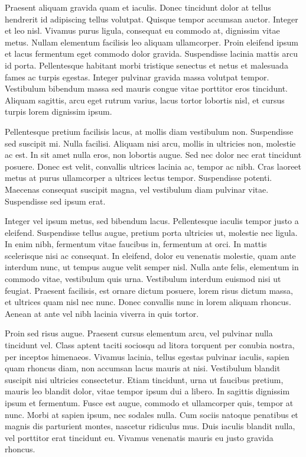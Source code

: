 Praesent aliquam gravida quam et iaculis. Donec tincidunt dolor at tellus hendrerit id adipiscing tellus volutpat. Quisque tempor accumsan auctor. Integer et leo nisl. Vivamus purus ligula, consequat eu commodo at, dignissim vitae metus. Nullam elementum facilisis leo aliquam ullamcorper. Proin eleifend ipsum et lacus fermentum eget commodo dolor gravida. Suspendisse lacinia mattis arcu id porta. Pellentesque habitant morbi tristique senectus et netus et malesuada fames ac turpis egestas. Integer pulvinar gravida massa volutpat tempor. Vestibulum bibendum massa sed mauris congue vitae porttitor eros tincidunt. Aliquam sagittis, arcu eget rutrum varius, lacus tortor lobortis nisl, et cursus turpis lorem dignissim ipsum.

Pellentesque pretium facilisis lacus, at mollis diam vestibulum non. Suspendisse sed suscipit mi. Nulla facilisi. Aliquam nisi arcu, mollis in ultricies non, molestie ac est. In sit amet nulla eros, non lobortis augue. Sed nec dolor nec erat tincidunt posuere. Donec est velit, convallis ultrices lacinia ac, tempor ac nibh. Cras laoreet metus at purus ullamcorper a ultrices lectus tempor. Suspendisse potenti. Maecenas consequat suscipit magna, vel vestibulum diam pulvinar vitae. Suspendisse sed ipsum erat.

Integer vel ipsum metus, sed bibendum lacus. Pellentesque iaculis tempor justo a eleifend. Suspendisse tellus augue, pretium porta ultricies ut, molestie nec ligula. In enim nibh, fermentum vitae faucibus in, fermentum at orci. In mattis scelerisque nisi ac consequat. In eleifend, dolor eu venenatis molestie, quam ante interdum nunc, ut tempus augue velit semper nisl. Nulla ante felis, elementum in commodo vitae, vestibulum quis urna. Vestibulum interdum euismod nisi ut feugiat. Praesent facilisis, est ornare dictum posuere, lorem risus dictum massa, et ultrices quam nisl nec nunc. Donec convallis nunc in lorem aliquam rhoncus. Aenean at ante vel nibh lacinia viverra in quis tortor.

Proin sed risus augue. Praesent cursus elementum arcu, vel pulvinar nulla tincidunt vel. Class aptent taciti sociosqu ad litora torquent per conubia nostra, per inceptos himenaeos. Vivamus lacinia, tellus egestas pulvinar iaculis, sapien quam rhoncus diam, non accumsan lacus mauris at nisi. Vestibulum blandit suscipit nisi ultricies consectetur. Etiam tincidunt, urna ut faucibus pretium, mauris leo blandit dolor, vitae tempor ipsum dui a libero. In sagittis dignissim ipsum et fermentum. Fusce est augue, commodo et ullamcorper quis, tempor at nunc. Morbi at sapien ipsum, nec sodales nulla. Cum sociis natoque penatibus et magnis dis parturient montes, nascetur ridiculus mus. Duis iaculis blandit nulla, vel porttitor erat tincidunt eu. Vivamus venenatis mauris eu justo gravida rhoncus.

